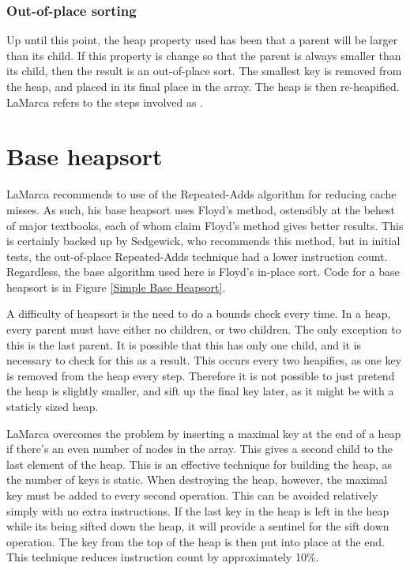 \subsubsection{Out-of-place sorting}
Up until this point, the heap property used has been that a parent will be
larger than its child. If this property is change so that the parent is always
smaller than its child, then the result is an out-of-place sort. The smallest
key is removed from the heap, and placed in its final place in the array. The
heap is then re-heapified. LaMarca refers to the steps involved as
.

\section{Base heapsort}
LaMarca recommends to use of the Repeated-Adds algorithm for reducing
cache misses. As such, his base heapsort uses Floyd's method, ostensibly at
the behest of major textbooks, each of whom claim Floyd's method gives better
results. This is certainly backed up by Sedgewick, who recommends this method,
but in initial tests, the out-of-place Repeated-Adds technique had a lower
instruction count. Regardless, the base algorithm used here is Floyd's in-place
sort. Code for a base heapsort is in Figure \ref{Simple Base Heapsort}.


A difficulty of heapsort is the need to do a bounds check every time. In a heap,
every parent must have either no children, or two children. The only exception
to this is the last parent. It is possible that this has only one child, and it
is necessary to check for this as a result. This occurs every two heapifies, as
one key is removed from the heap every step. Therefore it is not possible to just
pretend the heap is slightly smaller, and sift up the final key later, as it
might be with a staticly sized heap.

LaMarca overcomes the problem by inserting a maximal key at the end of a heap if
there's an even number of nodes in the array. This gives a second child to the
last element of the heap. This is an effective technique for building the heap,
as the number of keys is static. When destroying the heap, however, the
maximal key must be added to every second operation. This can be avoided
relatively simply with no extra instructions. If the last key in the heap is
left in the heap while its being sifted down the heap, it will provide a
sentinel for the sift down operation. The key from the top of the heap is then
put into place at the end. This technique reduces instruction count by
approximately 10\%.

